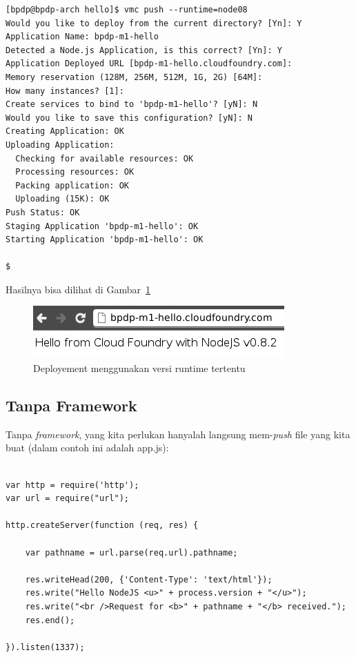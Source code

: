 \lstset{language=bash,caption=Deployment ke CF dengan memilih runtime Node.js}
\begin{lstlisting}
[bpdp@bpdp-arch hello]$ vmc push --runtime=node08 
Would you like to deploy from the current directory? [Yn]: Y 
Application Name: bpdp-m1-hello 
Detected a Node.js Application, is this correct? [Yn]: Y 
Application Deployed URL [bpdp-m1-hello.cloudfoundry.com]: 
Memory reservation (128M, 256M, 512M, 1G, 2G) [64M]: 
How many instances? [1]: 
Create services to bind to 'bpdp-m1-hello'? [yN]: N 
Would you like to save this configuration? [yN]: N 
Creating Application: OK 
Uploading Application: 
  Checking for available resources: OK 
  Processing resources: OK 
  Packing application: OK 
  Uploading (15K): OK   
Push Status: OK 
Staging Application 'bpdp-m1-hello': OK                                         
Starting Application 'bpdp-m1-hello': OK                                        

$
\end{lstlisting}

Hasilnya bisa dilihat di Gambar~\ref{fig:modul1-hello-ganti-runtime}

  \begin{figure}
    \begin{center}
      \includegraphics[scale=0.5]{images/modul1-hello-ganti-runtime.jpg}
    \end{center}
    \caption{Deployement menggunakan versi runtime tertentu}
    \label{fig:modul1-hello-ganti-runtime}
  \end{figure}

\subsection{Tanpa Framework}

Tanpa \textit{framework}, yang kita perlukan hanyalah langsung mem-\textit{push} file yang kita buat (dalam contoh ini adalah app.js):

\lstset{language=Javascript,caption=app.js tanpa framework}
\begin{lstlisting}

var http = require('http'); 
var url = require("url"); 

http.createServer(function (req, res) { 

    var pathname = url.parse(req.url).pathname; 

    res.writeHead(200, {'Content-Type': 'text/html'}); 
    res.write("Hello NodeJS <u>" + process.version + "</u>"); 
    res.write("<br />Request for <b>" + pathname + "</b> received."); 
    res.end(); 

}).listen(1337);
\end{lstlisting}


